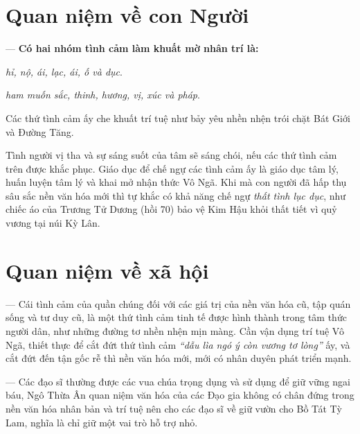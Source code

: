 \section{Quan niệm về con Người} %
\label{sec:72_73_con_nguoi}

--- {\bf Có hai nhóm tình cảm làm khuất mờ nhân trí là:}

\begin{description}[leftmargin=!,labelwidth=\widthof{\bfseries Thất tình:}]
    \item[Thất tình:] \emph{hỉ, nộ, ái, lạc, ái, ố và dục}.

    \item[Lục dục:] \emph{ham muốn sắc, thinh, hương, vị, xúc và pháp}.
\end{description}

Các thứ tình cảm ấy che khuất trí tuệ như bảy yêu nhền nhện trói chặt Bát Giới và Đường Tăng.

Tình người vị tha và sự sáng suốt của tâm sẽ sáng chói, nếu các thứ tình cảm trên được khắc phục. Giáo dục để chế ngự các tình cảm ấy là giáo dục tâm lý, huấn luyện tâm lý và khai mở nhận thức Vô Ngã. Khi mà con người đã hấp thụ sâu sắc nền văn hóa mới thì tự khắc có khả năng chế ngự \emph{thất tình lục dục}, như chiếc áo của Trương Tử Dương (hồi 70) bảo vệ Kim Hậu khỏi thất tiết vì quỷ vương tại núi Kỳ Lân.

\section{Quan niệm về xã hội} %
\label{sec:72_73_xa_hoi}

--- Cái tình cảm của quần chúng đối với các giá trị của nền văn hóa cũ, tập quán sống và tư duy cũ, là một thứ tình cảm tinh tế được hình thành trong tâm thức người dân, như những đường tơ nhền nhện mịn màng. Cần vận dụng trí tuệ Vô Ngã, thiết thực để cắt đứt thứ tình cảm \emph{``dẫu lìa ngó ý còn vương tơ lòng''} ấy, và cắt đứt đến tận gốc rễ thì nền văn hóa mới, mới có nhân duyên phát triển mạnh.

--- Các đạo sĩ thường được các vua chúa trọng dụng và sử dụng để giữ vững ngai báu, Ngô Thừa Ân quan niệm văn hóa của các Đạo gia không có chân đứng trong nền văn hóa nhân bản và trí tuệ nên cho các đạo sĩ về giữ vườn cho Bồ Tát Tỳ Lam, nghĩa là chỉ giữ một vai trò hỗ trợ nhỏ.
